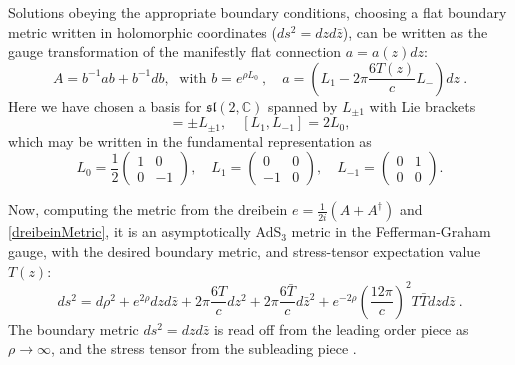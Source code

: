 \documentclass[12pt]{article}
\newcommand{\CC}{\mathbb{C}}
\newcommand{\lie}[1]{\mathfrak{#1}}
\begin{document}
Solutions obeying the appropriate boundary conditions, choosing a flat boundary metric written in holomorphic coordinates ($ds^2=dzd\bar{z}$), can be written as the gauge transformation of the manifestly flat connection $a=a(z)dz$:
\begin{equation}\label{CSbackground}
	A=b^{-1} a b + b^{-1}db,\;\text{ with } b=e^{\rho L_0}~,\quad
	a=\left(L_1-2\pi \frac{6 T(z)}{c} L_{-}\right)dz~.
\end{equation}
Here we have chosen a basis for $\lie{sl}(2,\CC)$ spanned by $L_{\pm 1}$ with Lie brackets
\begin{equation}
	[L_{\pm 1},L_0]=\pm L_{\pm 1},\quad [L_1,L_{-1}]=2L_0,
\end{equation}
which may be written in the fundamental representation as
\begin{equation}
	L_0=\frac{1}{2}\begin{pmatrix}1&0\\0&-1\end{pmatrix},\quad L_1=\begin{pmatrix}0&0\\-1&0\end{pmatrix},\quad L_{-1}=\begin{pmatrix}0&1\\0&0\end{pmatrix}.
\end{equation}

Now, computing the metric from the dreibein $e=\tfrac{1}{2i}(A+A^\dagger)$ and \cref{dreibeinMetric}, it is an asymptotically AdS$_3$ metric in the Fefferman-Graham gauge, with the desired boundary metric, and stress-tensor expectation value $T(z)$:
\begin{equation}
	ds^2 = d\rho^2 +e^{2\rho} dz d\bar{z} + 2\pi \frac{6 T}{c} dz^2 + 2\pi \frac{6 \bar{T}}{c} d\bar{z}^2 + e^{-2\rho}\left(\frac{12\pi}{c}\right)^2 T \bar{T} dz d\bar{z}~.
\end{equation}
The boundary metric $ds^2=dzd\bar{z}$ is read off from the leading order piece as $\rho\to\infty$, and the stress tensor from the subleading piece \cite{Balasubramanian:1999re}.
\end{document}
